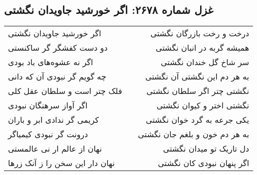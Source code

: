 \begin{center}
\section*{غزل شماره ۲۶۷۸: اگر خورشید جاویدان نگشتی}
\label{sec:2678}
\begin{longtable}{l p{0.5cm} r}
اگر خورشید جاویدان نگشتی
&&
درخت و رخت بازرگان نگشتی
\\
دو دست کفشگر گر ساکنستی
&&
همیشه گربه در انبان نگشتی
\\
اگر نه عشوه‌های باد بودی
&&
سر شاخ گل خندان نگشتی
\\
چه گویم گر نبودی آن که دانی
&&
به هر دم این نگشتی آن نگشتی
\\
فلک چتر است و سلطان عقل کلی
&&
نگشتی چتر اگر سلطان نگشتی
\\
اگر آواز سرهنگان نبودی
&&
نگشتی اختر و کیوان نگشتی
\\
کریمی گر ندادی ابر و باران
&&
یکی جرعه به گرد خوان نگشتی
\\
درونت گر نبودی کیمیاگر
&&
به هر دم خون و بلغم جان نگشتی
\\
نهان از عالم ار نی عالمستی
&&
دل تاریک تو میدان نگشتی
\\
نهان دار این سخن را ز آنک زرها
&&
اگر پنهان نبودی کان نگشتی
\\
\end{longtable}
\end{center}
